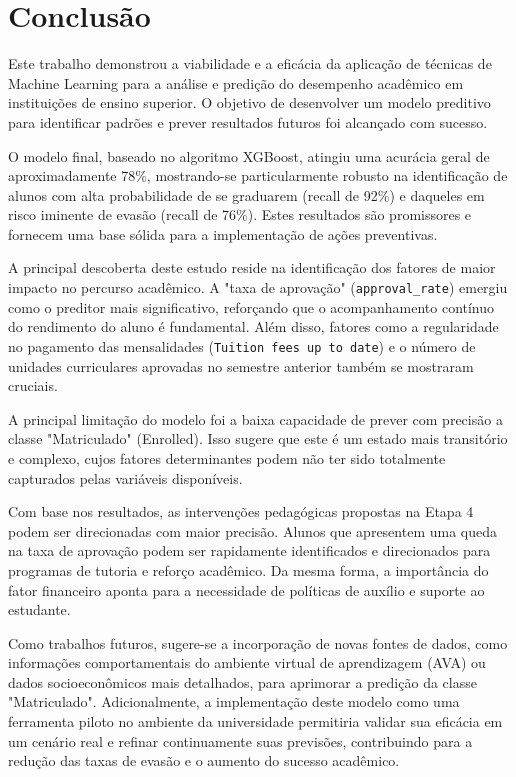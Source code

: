 \documentclass[12pt]{article}
\begin{document}
\section{Conclusão}
Este trabalho demonstrou a viabilidade e a eficácia da aplicação de técnicas de Machine Learning para a análise e predição do desempenho acadêmico em instituições de ensino superior. O objetivo de desenvolver um modelo preditivo para identificar padrões e prever resultados futuros foi alcançado com sucesso.

O modelo final, baseado no algoritmo XGBoost, atingiu uma acurácia geral de aproximadamente 78\%, mostrando-se particularmente robusto na identificação de alunos com alta probabilidade de se graduarem (recall de 92\%) e daqueles em risco iminente de evasão (recall de 76\%). Estes resultados são promissores e fornecem uma base sólida para a implementação de ações preventivas.

A principal descoberta deste estudo reside na identificação dos fatores de maior impacto no percurso acadêmico. A "taxa de aprovação" (\texttt{approval\_rate}) emergiu como o preditor mais significativo, reforçando que o acompanhamento contínuo do rendimento do aluno é fundamental. Além disso, fatores como a regularidade no pagamento das mensalidades (\texttt{Tuition fees up to date}) e o número de unidades curriculares aprovadas no semestre anterior também se mostraram cruciais.

A principal limitação do modelo foi a baixa capacidade de prever com precisão a classe "Matriculado" (Enrolled). Isso sugere que este é um estado mais transitório e complexo, cujos fatores determinantes podem não ter sido totalmente capturados pelas variáveis disponíveis.

Com base nos resultados, as intervenções pedagógicas propostas na Etapa 4 podem ser direcionadas com maior precisão. Alunos que apresentem uma queda na taxa de aprovação podem ser rapidamente identificados e direcionados para programas de tutoria e reforço acadêmico. Da mesma forma, a importância do fator financeiro aponta para a necessidade de políticas de auxílio e suporte ao estudante.

Como trabalhos futuros, sugere-se a incorporação de novas fontes de dados, como informações comportamentais do ambiente virtual de aprendizagem (AVA) ou dados socioeconômicos mais detalhados, para aprimorar a predição da classe "Matriculado". Adicionalmente, a implementação deste modelo como uma ferramenta piloto no ambiente da universidade permitiria validar sua eficácia em um cenário real e refinar continuamente suas previsões, contribuindo para a redução das taxas de evasão e o aumento do sucesso acadêmico.
\renewcommand{\refname}{Referências}


\end{document}
